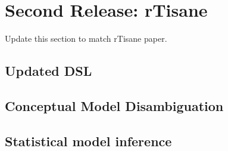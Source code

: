 \section{Second Release: rTisane}
{\color{orange} Update this section to match rTisane paper.}

\subsection{Updated DSL}
\subsection{Conceptual Model Disambiguation}
\subsection{Statistical model inference}